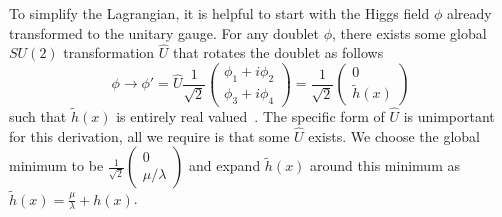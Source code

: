 To simplify the Lagrangian, it is helpful to start with the Higgs field $\phi$ already transformed to the unitary gauge. For any doublet $\phi$, there exists some global $SU(2)$ transformation $\hat{U}$ that rotates the doublet as follows
\begin{equation}
	\phi\to\phi'=\hat{U}\frac{1}{\sqrt{2}}\begin{pmatrix}\phi_1+i\phi_2\\\phi_3+i\phi_4\end{pmatrix}=\frac{1}{\sqrt{2}}\begin{pmatrix}0\\\tilde{h}(x)\end{pmatrix}
\end{equation}
such that $\tilde{h}(x)$ is entirely real valued~\cite{mandl2010quantum}. The specific form of $\hat{U}$ is unimportant for this derivation, all we require is that some $\hat{U}$ exists. We choose the global minimum to be $\frac{1}{\sqrt{2}}\begin{pmatrix}0\\\mu/\lambda\end{pmatrix}$ and expand $\tilde{h}(x)$ around this minimum as $\tilde{h}(x)=\frac{\mu}{\lambda}+h(x)$.

